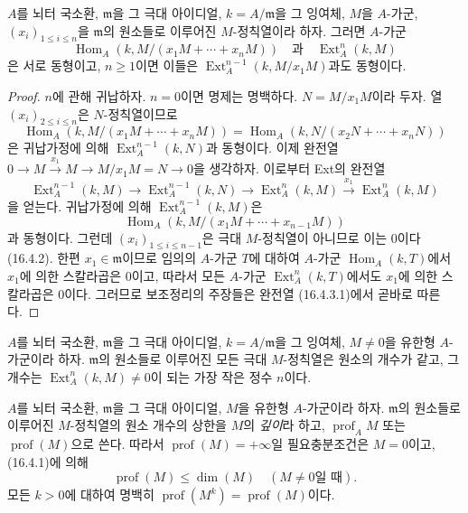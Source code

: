 \begin{lemma}[16.4.3]
\label{0.16.4.3-fr}
$A$를 뇌터 국소환, $\mathfrak{m}$을 그 극대 아이디얼,
$k=A/\mathfrak{m}$을 그 잉여체, $M$을 $A$-가군,
$(x_i)_{1\leq i\leq n}$을 $\mathfrak{m}$의 원소들로 이루어진
$M$-정칙열이라 하자. 그러면 $A$-가군
\[
  \operatorname{Hom}_A(k,M/(x_1M+\cdots+x_nM))
  \quad\text{과}\quad \operatorname{Ext}^n_A(k,M)
\]
은 서로 동형이고, $n\geq1$이면 이들은
$\operatorname{Ext}^{n-1}_A(k,M/x_1M)$과도 동형이다.
\end{lemma}

\begin{proof}
$n$에 관해 귀납하자. $n=0$이면 명제는 명백하다.
$N=M/x_1M$이라 두자. 열 $(x_i)_{2\leq i\leq n}$은
$N$-정칙열이므로
\[
  \operatorname{Hom}_A(k,M/(x_1M+\cdots+x_nM))
  =\operatorname{Hom}_A(k,N/(x_2N+\cdots+x_nN))
\]
은 귀납가정에 의해 $\operatorname{Ext}^{n-1}_A(k,N)$과 동형이다.
이제 완전열
$0\to M\xrightarrow{x_1}M\to M/x_1M=N\to0$을 생각하자.
이로부터 Ext의 완전열
\begin{equation}
\label{0.16.4.3.1-fr}
\tag{16.4.3.1}
  \operatorname{Ext}^{n-1}_A(k,M)
  \to\operatorname{Ext}^{n-1}_A(k,N)
  \to\operatorname{Ext}^n_A(k,M)
  \xrightarrow{x_1}\operatorname{Ext}^n_A(k,M)
\end{equation}
을 얻는다. 귀납가정에 의해 $\operatorname{Ext}^{n-1}_A(k,M)$은
\[
  \operatorname{Hom}_A(k,M/(x_1M+\cdots+x_{n-1}M))
\]
과 동형이다. 그런데 $(x_i)_{1\leq i\leq n-1}$은 극대
$M$-정칙열이 아니므로 이는 0이다 (16.4.2). 한편
$x_1\in\mathfrak{m}$이므로 임의의 $A$-가군 $T$에 대하여
$A$-가군 $\operatorname{Hom}_A(k,T)$에서 $x_1$에 의한 스칼라곱은
0이고, 따라서 모든 $A$-가군 $\operatorname{Ext}^n_A(k,T)$에서도
$x_1$에 의한 스칼라곱은 0이다. 그러므로 보조정리의 주장들은
완전열 (16.4.3.1)에서 곧바로 따른다.
\end{proof}

\begin{corollary}[16.4.4]
\label{0.16.4.4-fr}
$A$를 뇌터 국소환, $\mathfrak{m}$을 그 극대 아이디얼,
$k=A/\mathfrak{m}$을 그 잉여체, $M\neq0$을 유한형 $A$-가군이라
하자. $\mathfrak{m}$의 원소들로 이루어진 모든 극대 $M$-정칙열은
원소의 개수가 같고, 그 개수는
$\operatorname{Ext}^n_A(k,M)\neq0$이 되는 가장 작은 정수 $n$이다.
\end{corollary}

\begin{definition}[16.4.5]
\label{0.16.4.5-fr}
$A$를 뇌터 국소환, $\mathfrak{m}$을 그 극대 아이디얼, $M$을 유한형
$A$-가군이라 하자. $\mathfrak{m}$의 원소들로 이루어진 $M$-정칙열의
원소 개수의 상한을 $M$의 \emph{깊이}라 하고,
$\operatorname{prof}_A M$ 또는 $\operatorname{prof}(M)$으로 쓴다.
따라서 $\operatorname{prof}(M)=+\infty$일 필요충분조건은 $M=0$이고,
(16.4.1)에 의해
\begin{equation}
\label{0.16.4.5.1-fr}
\tag{16.4.5.1}
  \operatorname{prof}(M)\leq\dim(M)\quad(M\neq0\text{일 때}).
\end{equation}
모든 $k>0$에 대하여 명백히
$\operatorname{prof}(M^k)=\operatorname{prof}(M)$이다.
\end{definition}

